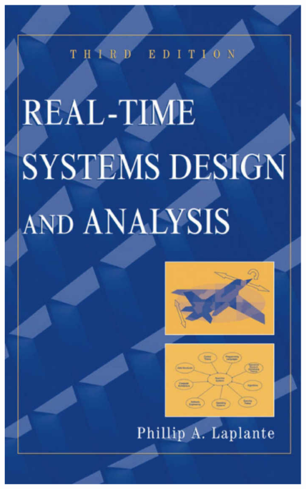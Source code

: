 \documentclass[dvipsnames,14pt,t]{beamer}
\begin{document}
\begin{frame}[c]
\begin{textblock}{11}
         {\includegraphics[scale=0.076]{pics/p1.jpg}} 

\end{textblock}
\end{frame}
\end{document}
